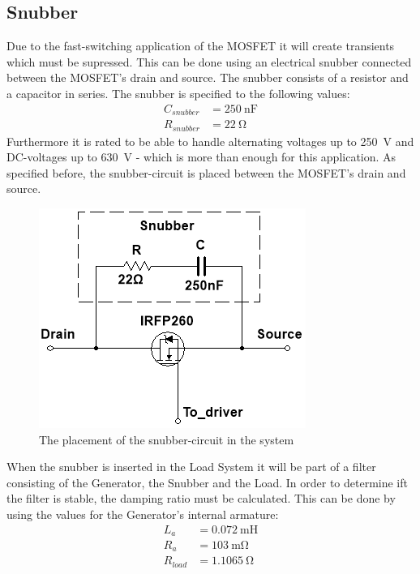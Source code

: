 \newpage
\subsection{Snubber}
Due to the fast-switching application of the MOSFET it will create transients which must be supressed. This can be done using an electrical snubber connected between the MOSFET's drain and source. The snubber consists of a resistor and a capacitor in series. The snubber is specified to the following values:
\begin{equation}
	\begin{split}
		C_{snubber} &= \SI{250}{\nano \farad}\\
		R_{snubber} &= \SI{22}{\ohm}
	\end{split}
\end{equation}
Furthermore it is rated to be able to handle alternating voltages up to \SI{250}{\volt} and DC-voltages up to \SI{630}{\volt} - which is more than enough for this application. As specified before, the snubber-circuit is placed between the MOSFET's drain and source.

\begin{figure}[H]
	\centering
	\includegraphics[width=0.5\linewidth]{Hardware/LoadSystem/Snubber}
	\caption{The placement of the snubber-circuit in the system}
	\label{fig:SnubberCircuit}
\end{figure}

When the snubber is inserted in the Load System it will be part of a filter consisting of the Generator, the Snubber and the Load. In order to determine ift the filter is stable, the damping ratio must be calculated. This can be done by using the values for the Generator's internal armature: 
\begin{equation}
	\begin{split}
		L_a &= \SI{0.072}{\milli \henry}\\
		R_a &= \SI{103}{\milli \ohm}\\
		R_{load} &= \SI{1.1065}{\ohm}
	\end{split}
\end{equation}

